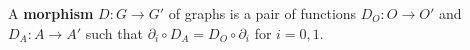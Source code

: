 A \textbf{morphism} $D: G \rightarrow G'$ of graphs is a pair of functions $D_O: O \rightarrow O'$ and $D_A: A \rightarrow A'$ such that $\partial_i \circ D_A = D_O \circ \partial_i$ for $i = 0, 1$.